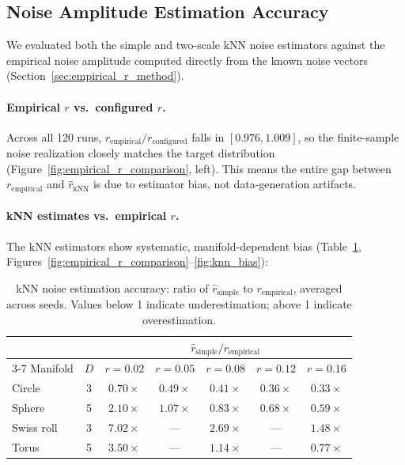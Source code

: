 \documentclass{article}
\begin{document}
\subsection{Noise Amplitude Estimation Accuracy}
\label{sec:noise_amp_accuracy}

We evaluated both the simple and two-scale kNN noise estimators against the empirical noise amplitude computed directly from the known noise vectors (Section~\ref{sec:empirical_r_method}).

\paragraph{Empirical $r$ vs.\ configured $r$.} Across all 120 runs, $r_{\text{empirical}} / r_{\text{configured}}$ falls in $[0.976, 1.009]$, so the finite-sample noise realization closely matches the target distribution (Figure~\ref{fig:empirical_r_comparison}, left). This means the entire gap between $r_{\text{empirical}}$ and $\hat{r}_{\text{kNN}}$ is due to estimator bias, not data-generation artifacts.

\paragraph{kNN estimates vs.\ empirical $r$.} The kNN estimators show systematic, manifold-dependent bias (Table~\ref{tab:r_estimation}, Figures~\ref{fig:empirical_r_comparison}--\ref{fig:knn_bias}):

\begin{table}[htbp]
\caption{kNN noise estimation accuracy: ratio of $\hat{r}_{\text{simple}}$ to $r_{\text{empirical}}$, averaged across seeds. Values below 1 indicate underestimation; above 1 indicate overestimation.}
\label{tab:r_estimation}
\centering
\begin{tabular}{@{}lcccccc@{}}
\toprule
& & \multicolumn{5}{c}{$\hat{r}_{\text{simple}} / r_{\text{empirical}}$} \\
\cmidrule(l){3-7}
Manifold & $D$ & $r{=}0.02$ & $r{=}0.05$ & $r{=}0.08$ & $r{=}0.12$ & $r{=}0.16$ \\
\midrule
Circle & 3 & $0.70\times$ & $0.49\times$ & $0.41\times$ & $0.36\times$ & $0.33\times$ \\
Sphere & 5 & $2.10\times$ & $1.07\times$ & $0.83\times$ & $0.68\times$ & $0.59\times$ \\
Swiss roll & 3 & $7.02\times$ & --- & $2.69\times$ & --- & $1.48\times$ \\
Torus & 5 & $3.50\times$ & --- & $1.14\times$ & --- & $0.77\times$ \\
\bottomrule
\end{tabular}
\end{table}
\end{document}
